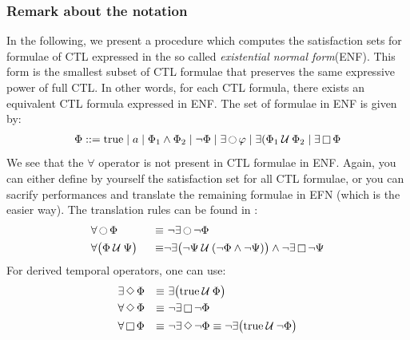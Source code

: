 \documentclass{article}
\begin{document}
\subsubsection{Remark about the notation}
In the following, we present a procedure which computes the satisfaction sets for formulae of 
CTL expressed in the so called \emph{existential normal form}(ENF). This form is the smallest subset of CTL formulae that preserves the same expressive power of full CTL. In other words, for each CTL formula, there exists an equivalent CTL formula expressed in ENF. The set of formulae in ENF is given by: 
\begin{align*}
    & \Phi ::= \text{true} \mid a \mid \Phi_1 \land \Phi_2 \mid \neg \Phi \mid \exists \mathop{\ocircle}{\varphi} \mid \exists (\Phi_1 \mathbin{\mathcal{U}} \Phi_2 \mid \exists \mathop{\square} \Phi \\
\end{align*}
We see that the $\forall$ operator is not present in CTL formulae in ENF.
Again, you can either define by yourself the satisfaction set for all CTL formulae, or you can sacrify performances and translate the remaining formulae in EFN (which is the easier way).
The translation rules can be found in \cite[Paragraph 6.2.4]{BaKa}:
\begin{align*}
    & \forall \mathop{\ocircle}{\Phi} & \equiv & \text{ } \neg \exists \mathop{\ocircle}{\neg \Phi} \\
    & \forall \big( \Phi \mathbin{\mathcal{U}} \Psi \big) & \text{ } \equiv & \neg \exists \big( \neg \Psi \mathbin{\mathcal{U}} (\neg \Phi \land \neg \Psi) \big) \land \neg \exists \mathop{\square} \neg \Psi \\
\end{align*}
For derived temporal operators, one can use:
\begin{align*}
    & \exists \mathop{\Diamond} \Phi & \equiv & \text{ } \exists \big(\text{true} \mathbin{\mathcal{U}} \Phi\big) \\
    & \forall \mathop{\Diamond} \Phi & \equiv  & \text{ }\neg \exists \mathop{\square} \neg \Phi \\ 
    & \forall \mathop{\square} \Phi & \equiv & \text{ } \neg \exists \mathop{\Diamond} \neg \Phi \equiv \neg \exists \big(\text{true} \mathbin{\mathcal{U}} \neg \Phi \big) \\
\end{align*}
\end{document}
